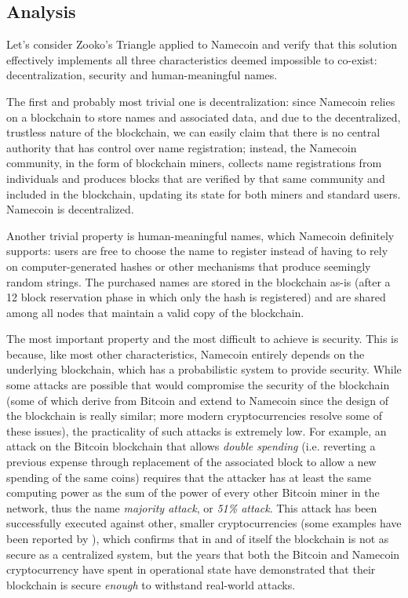 \documentclass[mscthesis]{usiinfthesis}
\begin{document}
\subsection{Analysis}
Let's consider Zooko's Triangle applied to Namecoin and verify that this solution effectively implements all three characteristics deemed impossible to co-exist: decentralization, security and human-meaningful names.

The first and probably most trivial one is decentralization: since Namecoin relies on a blockchain to store names and associated data, and due to the decentralized, trustless nature of the blockchain, we can easily claim that there is no central authority that has control over name registration; instead, the Namecoin community, in the form of blockchain miners, collects name registrations from individuals and produces blocks that are verified by that same community and included in the blockchain, updating its state for both miners and standard users. Namecoin is decentralized.

Another trivial property is human-meaningful names, which Namecoin definitely supports: users are free to choose the name to register instead of having to rely on computer-generated hashes or other mechanisms that produce seemingly random strings. The purchased names are stored in the blockchain as-is (after a 12 block reservation phase in which only the hash is registered) and are shared among all nodes that maintain a valid copy of the blockchain.

The most important property and the most difficult to achieve is security. This is because, like most other characteristics, Namecoin entirely depends on the underlying blockchain, which has a probabilistic system to provide security. While some attacks are possible that would compromise the security of the blockchain (some of which derive from Bitcoin and extend to Namecoin since the design of the blockchain is really similar; more modern cryptocurrencies resolve some of these issues), the practicality of such attacks is extremely low. For example, an attack on the Bitcoin blockchain that allows \emph{double spending} (i.e. reverting a previous expense through replacement of the associated block to allow a new spending of the same coins) requires that the attacker has at least the same computing power as the sum of the power of every other Bitcoin miner in the network, thus the name \emph{majority attack}, or \emph{51\% attack}. This attack has been successfully executed against other, smaller cryptocurrencies (some examples have been reported by \cite{website:realwordmajorityattacks}), which confirms that in and of itself the blockchain is not as secure as a centralized system, but the years that both the Bitcoin and Namecoin cryptocurrency have spent in operational state have demonstrated that their blockchain is secure \emph{enough} to withstand real-world attacks. %
\end{document}
